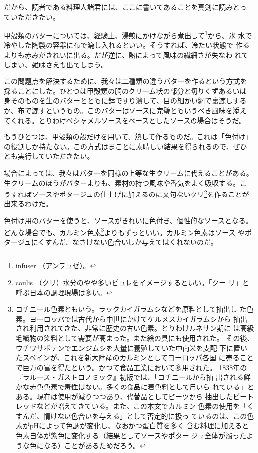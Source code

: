 だから、読者である料理人諸君には、ここに書いてあることを真剣に読みとっ
ていただきたい。

甲殻類のバターについては、経験上、湯煎にかけながら煮出して\footnote{infuser
  （アンフュゼ）。}から、氷
水で冷やした陶製の容器に布で漉し入れるといい。そうすれば、冷たい状態で
作るよりも赤みがきれいに出る。だが逆に、熱によって風味の繊細さが失なわ
れてしまい、雑味さえも出てしまう。

この問題点を解決するために、我々は二種類の違うバターを作るという方式を
採ることにした。ひとつは甲殻類の胴のクリーム状の部分と切りくずあるいは
身そのものを生のバターとともに鉢ですり潰して、目の細かい網で裏漉しする
か、布で漉すというもの。このバターはソースに完璧ともいうべき風味を添え
てくれる。とりわけベシャメルソースをベースとしたソースの場合はそうだ。

もうひとつは、甲殻類の殻だけを用いて、熱して作るものだ。これは「色付け」
の役割しか持たない。この方式はまことに素晴しい結果を得られるので、ぜひ
とも実行していただきたい。

場合によっては、我々はバターを同様の上等な生クリームに代えることがある。
生クリームのほうがバターよりも、素材の持つ風味や香気をよく吸収する。こ
うすればソースやポタージュの仕上げに加えるのに文句ないクリ\footnote{coulis
  （クリ）水分のやや多いピュレをイメージするといい。「クー
  リ」と呼ぶ日本の調理現場は多い。}を作ることが 出来るわけだ。

色付け用のバターを使うと、ソースがきれいに色付き、個性的なソースとなる。
どんな場合でも、カルミン色素\footnote{コチニール色素ともいう。ラックカイガラムシなどを原料として抽出し
  た色素。ヨーロッパでは古代から中世にかけてケルメスカイガラムシから
  抽出され利用されてきた、非常に歴史の古い色素。とりわけルネサン期に
  は高級毛織物の染料として需要が高まった。また絵の具にも使用された。
  その後、ウチワサボテンでエンジムシを大量に養殖していた中南米を支配
  下に置いたスペインが、これを新大陸産のカルミンとしてヨーロッパ各国
  に売ることで巨万の富を得たという。かつて食品工業において多用された。
  1838年の『ラルース・ガストロノミック』初版では、「コチニールから抽
  出される鮮かな赤色色素で毒性はない。多くの食品に着色料として用いら
  れている」とある。現在は使用が減りつつあり、代替品としてビーツから
  抽出したビートレッドなどが増えてきている。また、この本文でカルミン
  色素の使用を「くすんだ、情けない色合いを与える」として否定的に扱っ
  ているのは、この色素がpHによって色調が変化し、なおかつ蛋白質を多く
  含む料理に加えると色素自体が紫色に変化する（結果としてソースやポター
  ジュ全体が濁ったような色になる）ことがあるためだろう。}よりもずっといい。カルミン色素はソース
やポタージュにくすんだ、なさけない色合いしか与えてはくれないのだ。

